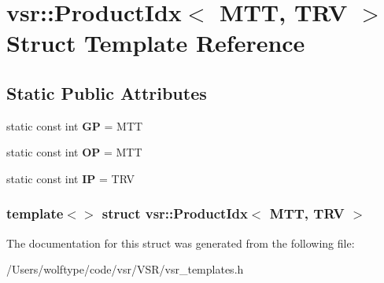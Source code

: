 \hypertarget{structvsr_1_1_product_idx_3_01_m_t_t_00_01_t_r_v_01_4}{\section{vsr\-:\-:Product\-Idx$<$ M\-T\-T, T\-R\-V $>$ Struct Template Reference}
\label{structvsr_1_1_product_idx_3_01_m_t_t_00_01_t_r_v_01_4}
}
\subsection*{Static Public Attributes}
\begin{DoxyCompactItemize}
\item 
\hypertarget{structvsr_1_1_product_idx_3_01_m_t_t_00_01_t_r_v_01_4_ab082fa00d20876873a596fac20ac32f3}{static const int {\bfseries G\-P} = M\-T\-T}\label{structvsr_1_1_product_idx_3_01_m_t_t_00_01_t_r_v_01_4_ab082fa00d20876873a596fac20ac32f3}

\item 
\hypertarget{structvsr_1_1_product_idx_3_01_m_t_t_00_01_t_r_v_01_4_afd52919ec35144810b2b5a118e66cf42}{static const int {\bfseries O\-P} = M\-T\-T}\label{structvsr_1_1_product_idx_3_01_m_t_t_00_01_t_r_v_01_4_afd52919ec35144810b2b5a118e66cf42}

\item 
\hypertarget{structvsr_1_1_product_idx_3_01_m_t_t_00_01_t_r_v_01_4_ab8ef77ac335707ea9e1da6c491889035}{static const int {\bfseries I\-P} = T\-R\-V}\label{structvsr_1_1_product_idx_3_01_m_t_t_00_01_t_r_v_01_4_ab8ef77ac335707ea9e1da6c491889035}

\end{DoxyCompactItemize}
\subsubsection*{template$<$$>$ struct vsr\-::\-Product\-Idx$<$ M\-T\-T, T\-R\-V $>$}



The documentation for this struct was generated from the following file\-:\begin{DoxyCompactItemize}
\item 
/\-Users/wolftype/code/vsr/\-V\-S\-R/vsr\-\_\-templates.\-h\end{DoxyCompactItemize}
